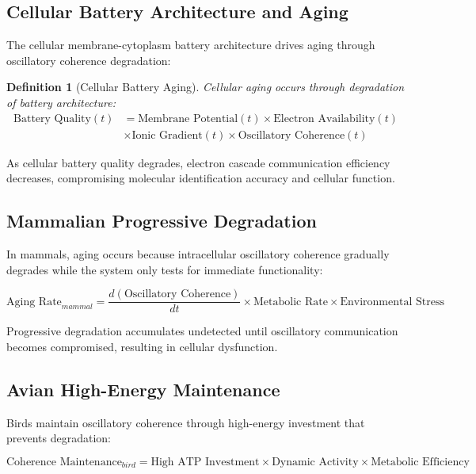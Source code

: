 \documentclass[12pt,a4paper]{article}
\newtheorem{definition}{Definition}
\begin{document}
{\subsection{Cellular Battery Architecture and Aging}

The cellular membrane-cytoplasm battery architecture drives aging through oscillatory coherence degradation:

\begin{definition}[Cellular Battery Aging]
Cellular aging occurs through degradation of battery architecture:
\begin{align}
\text{Battery Quality}(t) &= \text{Membrane Potential}(t) \times \text{Electron Availability}(t) \\
&\times \text{Ionic Gradient}(t) \times \text{Oscillatory Coherence}(t)
\end{align}
\end{definition}

As cellular battery quality degrades, electron cascade communication efficiency decreases, compromising molecular identification accuracy and cellular function.

\subsection{Mammalian Progressive Degradation}

In mammals, aging occurs because intracellular oscillatory coherence gradually degrades while the system only tests for immediate functionality:

\begin{equation}
\text{Aging Rate}_{mammal} = \frac{d(\text{Oscillatory Coherence})}{dt} \times \text{Metabolic Rate} \times \text{Environmental Stress}
\end{equation}

Progressive degradation accumulates undetected until oscillatory communication becomes compromised, resulting in cellular dysfunction.

\subsection{Avian High-Energy Maintenance}

Birds maintain oscillatory coherence through high-energy investment that prevents degradation:

\begin{equation}
\text{Coherence Maintenance}_{bird} = \text{High ATP Investment} \times \text{Dynamic Activity} \times \text{Metabolic Efficiency}
\end{equation}

}
\end{document}
